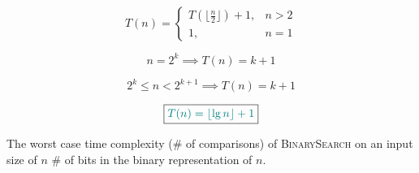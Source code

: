 \begin{frame}{}
  \[
    T(n) = \left\{\begin{array}{lr}
      T(\lfloor \frac{n}{2} \rfloor) + 1, & n > 2 \\
      1, & n = 1
    \end{array}\right.
  \]

  \pause
  \vspace{0.30cm}
  \[
    n = 2^k \implies T(n) = k + 1
  \]

  \pause
  \vspace{0.30cm}
  \[
    2^k \le n < 2^{k+1} \implies T(n) = k + 1
  \]

  \pause
  \vspace{0.30cm}
  \[
    \boxed{\textcolor{teal}{T(n) = \lfloor \lg n \rfloor + 1}}
  \]

  \pause
  \begin{theorem}
    The worst case time complexity (\# of comparisons) of \textsc{BinarySearch} on an input size of $n$ \red{\bf $=$} \# of bits in the binary representation of $n$.
  \end{theorem}
\end{frame}
